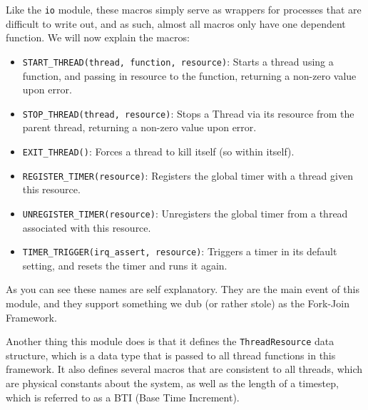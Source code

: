 \documentclass[letterpaper]{article}
\begin{document}
\begin{figure}[H]
\end{figure}

Like the \texttt{io} module, these macros simply serve as wrappers for processes that are difficult to write out, and as such, almost all macros only have one dependent function. We will now explain the macros:
\begin{itemize}
    \item \texttt{START\_THREAD(thread, function, resource)}: Starts a thread using a function, and passing in resource to the function, returning a non-zero value upon error.
    \item \texttt{STOP\_THREAD(thread, resource)}: Stops a Thread via its resource from the parent thread, returning a non-zero value upon error.
    \item \texttt{EXIT\_THREAD()}: Forces a thread to kill itself (so within itself).
    \item \texttt{REGISTER\_TIMER(resource)}: Registers the global timer with a thread given this resource.
    \item \texttt{UNREGISTER\_TIMER(resource)}: Unregisters the global timer from a thread associated with this resource.
    \item \texttt{TIMER\_TRIGGER(irq\_assert, resource)}: Triggers a timer in its default setting, and resets the timer and runs it again.
\end{itemize}

As you can see these names are self explanatory. They are the main event of this module, and they support something we dub (or rather stole) as the Fork-Join Framework.

Another thing this module does is that it defines the \texttt{ThreadResource} data structure, which is a data type that is passed to all thread functions in this framework. It also defines several macros that are consistent to all threads, which are physical constants about the system, as well as the length of a timestep, which is referred to as a BTI (Base Time Increment).
\end{document}
